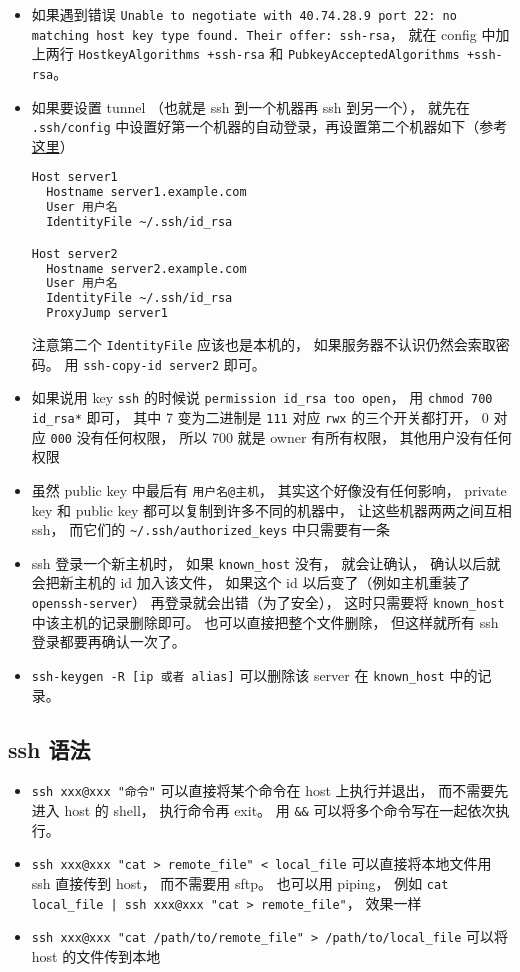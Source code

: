 \begin{itemize}
\item 如果遇到错误 \verb|Unable to negotiate with 40.74.28.9 port 22: no matching host key type found. Their offer: ssh-rsa|， 就在 config 中加上两行 \verb|HostkeyAlgorithms +ssh-rsa| 和 \verb|PubkeyAcceptedAlgorithms +ssh-rsa|。

\item 如果要设置 tunnel （也就是 ssh 到一个机器再 ssh 到另一个）， 就先在 \verb|.ssh/config| 中设置好第一个机器的自动登录，再设置第二个机器如下（参考\href{https://askubuntu.com/questions/311447/how-do-i-ssh-to-machine-a-via-b-in-one-command}{这里}）
\begin{lstlisting}[language=bash]
Host server1
  Hostname server1.example.com
  User 用户名
  IdentityFile ~/.ssh/id_rsa

Host server2
  Hostname server2.example.com
  User 用户名
  IdentityFile ~/.ssh/id_rsa
  ProxyJump server1
\end{lstlisting}
注意第二个 \verb|IdentityFile| 应该也是本机的， 如果服务器不认识仍然会索取密码。 用 \verb|ssh-copy-id server2| 即可。

\item 如果说用 key \verb`ssh` 的时候说 \verb`permission id_rsa too open`， 用 \verb`chmod 700 id_rsa*` 即可， 其中 7 变为二进制是 \verb`111` 对应 \verb`rwx` 的三个开关都打开， 0 对应 \verb`000` 没有任何权限， 所以 700 就是 owner 有所有权限， 其他用户没有任何权限
\item 虽然 public key 中最后有 \verb`用户名@主机`， 其实这个好像没有任何影响， private key 和 public key 都可以复制到许多不同的机器中， 让这些机器两两之间互相 ssh， 而它们的 \verb`~/.ssh/authorized_keys` 中只需要有一条
\item ssh 登录一个新主机时， 如果 \verb`known_host` 没有， 就会让确认， 确认以后就会把新主机的 id 加入该文件， 如果这个 id 以后变了（例如主机重装了 \verb`openssh-server`） 再登录就会出错（为了安全）， 这时只需要将 \verb`known_host` 中该主机的记录删除即可。 也可以直接把整个文件删除， 但这样就所有 ssh 登录都要再确认一次了。
\item \verb|ssh-keygen -R [ip 或者 alias]| 可以删除该 server 在 \verb|known_host| 中的记录。
\end{itemize}

\subsection{ssh 语法}
\begin{itemize}
\item \verb`ssh xxx@xxx "命令"` 可以直接将某个命令在 host 上执行并退出， 而不需要先进入 host 的 shell， 执行命令再 exit。 用 \verb`&&` 可以将多个命令写在一起依次执行。
\item \verb`ssh xxx@xxx "cat > remote_file" < local_file` 可以直接将本地文件用 ssh 直接传到 host， 而不需要用 sftp。 也可以用 piping， 例如 \verb`cat local_file | ssh xxx@xxx "cat > remote_file"`， 效果一样
\item \verb`ssh xxx@xxx "cat /path/to/remote_file" > /path/to/local_file` 可以将 host 的文件传到本地
\end{itemize}

